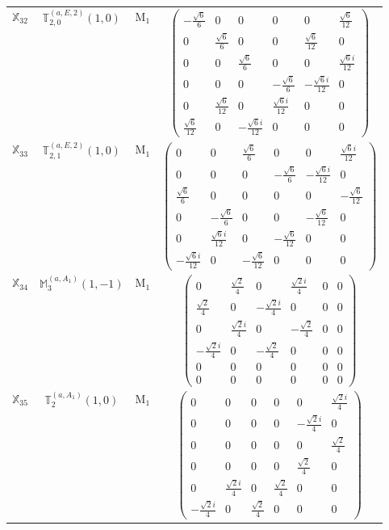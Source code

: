 \documentclass[fleqn,10pt,landscape]{article}
\begin{document}
\begin{itemize}
\begin{center}
\begin{longtable}{c|c|c|c}
$ \mathbb{X}_{32} $ & $\mathbb{T}_{2,0}^{(a,E,2)}(1,0)$ & M$_{1}$ & $\begin{pmatrix} - \frac{\sqrt{6}}{6} & 0 & 0 & 0 & 0 & \frac{\sqrt{6}}{12} \\ 0 & \frac{\sqrt{6}}{6} & 0 & 0 & \frac{\sqrt{6}}{12} & 0 \\ 0 & 0 & \frac{\sqrt{6}}{6} & 0 & 0 & \frac{\sqrt{6} i}{12} \\ 0 & 0 & 0 & - \frac{\sqrt{6}}{6} & - \frac{\sqrt{6} i}{12} & 0 \\ 0 & \frac{\sqrt{6}}{12} & 0 & \frac{\sqrt{6} i}{12} & 0 & 0 \\ \frac{\sqrt{6}}{12} & 0 & - \frac{\sqrt{6} i}{12} & 0 & 0 & 0 \end{pmatrix}$ \\
$ \mathbb{X}_{33} $ & $\mathbb{T}_{2,1}^{(a,E,2)}(1,0)$ & M$_{1}$ & $\begin{pmatrix} 0 & 0 & \frac{\sqrt{6}}{6} & 0 & 0 & \frac{\sqrt{6} i}{12} \\ 0 & 0 & 0 & - \frac{\sqrt{6}}{6} & - \frac{\sqrt{6} i}{12} & 0 \\ \frac{\sqrt{6}}{6} & 0 & 0 & 0 & 0 & - \frac{\sqrt{6}}{12} \\ 0 & - \frac{\sqrt{6}}{6} & 0 & 0 & - \frac{\sqrt{6}}{12} & 0 \\ 0 & \frac{\sqrt{6} i}{12} & 0 & - \frac{\sqrt{6}}{12} & 0 & 0 \\ - \frac{\sqrt{6} i}{12} & 0 & - \frac{\sqrt{6}}{12} & 0 & 0 & 0 \end{pmatrix}$ \\
$ \mathbb{X}_{34} $ & $\mathbb{M}_{3}^{(a,A_{1})}(1,-1)$ & M$_{1}$ & $\begin{pmatrix} 0 & \frac{\sqrt{2}}{4} & 0 & \frac{\sqrt{2} i}{4} & 0 & 0 \\ \frac{\sqrt{2}}{4} & 0 & - \frac{\sqrt{2} i}{4} & 0 & 0 & 0 \\ 0 & \frac{\sqrt{2} i}{4} & 0 & - \frac{\sqrt{2}}{4} & 0 & 0 \\ - \frac{\sqrt{2} i}{4} & 0 & - \frac{\sqrt{2}}{4} & 0 & 0 & 0 \\ 0 & 0 & 0 & 0 & 0 & 0 \\ 0 & 0 & 0 & 0 & 0 & 0 \end{pmatrix}$ \\
$ \mathbb{X}_{35} $ & $\mathbb{T}_{2}^{(a,A_{1})}(1,0)$ & M$_{1}$ & $\begin{pmatrix} 0 & 0 & 0 & 0 & 0 & \frac{\sqrt{2} i}{4} \\ 0 & 0 & 0 & 0 & - \frac{\sqrt{2} i}{4} & 0 \\ 0 & 0 & 0 & 0 & 0 & \frac{\sqrt{2}}{4} \\ 0 & 0 & 0 & 0 & \frac{\sqrt{2}}{4} & 0 \\ 0 & \frac{\sqrt{2} i}{4} & 0 & \frac{\sqrt{2}}{4} & 0 & 0 \\ - \frac{\sqrt{2} i}{4} & 0 & \frac{\sqrt{2}}{4} & 0 & 0 & 0 \end{pmatrix}$ \\

\end{longtable}
\end{center}
\end{itemize}
\end{document}
